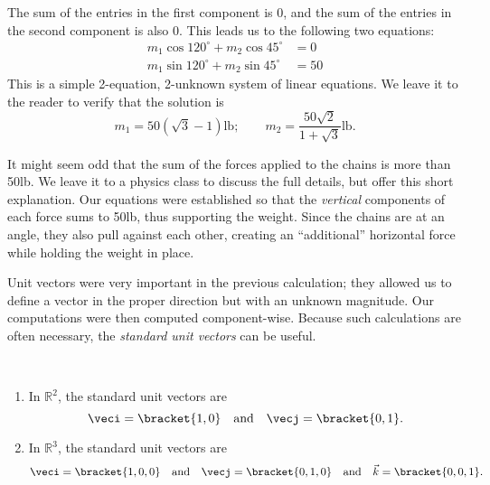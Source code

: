 \begin{example}
The sum of the entries in the first component is 0, and the sum of the entries in the second component is also 0. This leads us to the following two equations:
\begin{align*}
m_1\cos120^\circ + m_2\cos45^\circ &=0 \\
m_1\sin120^\circ + m_2\sin45^\circ &=50
\end{align*}
This is a simple 2-equation, 2-unknown system of linear equations. We leave it to the reader to verify that the solution is 
\[
m_1=50(\sqrt{3}-1)\text{lb}%
;\qquad
m_2=\frac{50\sqrt{2}}{1+\sqrt{3}}\text{lb}.%
\]

It might seem odd that the sum of the forces applied to the chains is more than 50lb. We leave it to a physics class to discuss the full details, but offer this short explanation. Our equations were established so that the \emph{vertical} components of each force sums to 50lb, thus supporting the weight. Since the chains are at an angle, they also pull against each other, creating an ``additional'' horizontal force while holding the weight in place.
\end{example}

Unit vectors were very important in the previous calculation; they allowed us to define a vector in the proper direction but with an unknown magnitude. Our computations were then computed component-wise. Because such calculations are often necessary, the \emph{standard unit vectors} can be useful.

\begin{definition}\label{def:standard_unit}
%
\mbox{}\\[-2\baselineskip]\parbox[t]{\linewidth}{\begin{enumerate}
	\item In $\mathbb{R}^2$, the standard unit vectors are
	\[\veci =\bracket{1,0}\quad \text{and}\quad \vecj =\bracket{0,1}.\]
	\item In $\mathbb{R}^3$, the standard unit vectors are
	\[\veci =\bracket{1,0,0}\quad \text{and}\quad \vecj =\bracket{0,1,0}\quad \text{and}\quad \vec k =\bracket{0,0,1}.\]
\end{enumerate}}
\end{definition}

